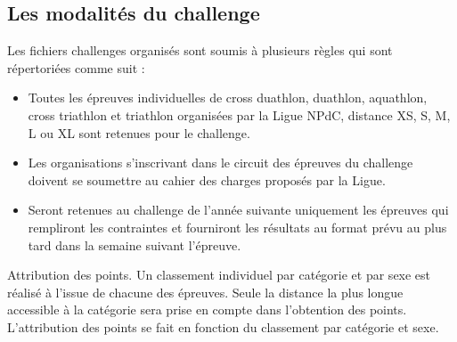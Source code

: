 	
	\subsection{Les modalités du challenge  }
	Les fichiers challenges organisés sont soumis à plusieurs règles qui sont répertoriées comme suit :
	\begin{itemize} 
	\item 	Toutes les épreuves individuelles de cross duathlon, duathlon, aquathlon, cross triathlon et triathlon organisées par la Ligue NPdC, distance XS, S, M, L ou XL sont retenues pour le challenge.
	\item 	Les organisations s'inscrivant dans le circuit des épreuves du challenge doivent se soumettre au cahier des charges proposés par la Ligue.
	 \item  Seront retenues au challenge de l’année suivante uniquement les épreuves qui rempliront les contraintes et fourniront les résultats au format prévu  au plus tard dans la semaine suivant l’épreuve.
	
	\end{itemize} 
\newpage
	 Attribution des points. Un classement individuel par catégorie et par sexe est réalisé à l’issue de chacune des épreuves. Seule la distance la plus longue accessible à la catégorie sera prise en compte dans l’obtention des points.\\
	L’attribution des points se fait en fonction du classement par catégorie et sexe. 
	
